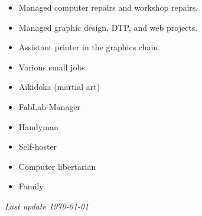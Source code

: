 \documentclass[10pt,a4paper,ragged2e,withhyper,normalphoto]{altacv}
\begin{document}
\begin{paracol}{2}
\divider

\begin{itemize}
\item Managed computer repairs and workshop repairs.
\end{itemize}

\divider

\begin{itemize}
\item Managed graphic design, DTP, and web projects.
\end{itemize}

\divider

\begin{itemize}
\item Assistant printer in the graphics chain.
\end{itemize}

\divider

\begin{itemize}
\item Various small jobs.
\end{itemize}

\end{paracol}


\begin{paracol}{2}

\begin{itemize}
\item Aïkidoka (martial art)
\item FabLab-Manager
\item Handyman
\switchcolumn
\item Self-hoster
\item Computer libertarian
\item Family
\end{itemize}

\end{paracol}

\bigskip

\raggedleft
{\textit{Last update \today}}
\end{document}
